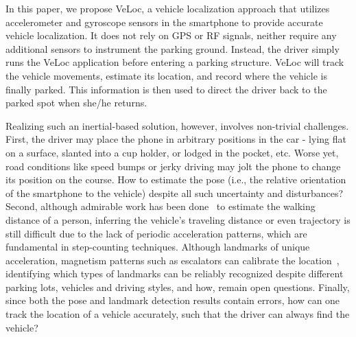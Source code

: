 

In this paper, we propose VeLoc, a vehicle localization approach that utilizes accelerometer and gyroscope sensors in the smartphone to provide accurate vehicle localization. It does not rely on GPS or RF signals, neither require any additional sensors to instrument the parking ground. Instead, the driver simply runs the VeLoc application before entering a parking structure. VeLoc will track the vehicle movements, estimate its location, and record where the vehicle is finally parked. This information is then used to direct the driver back to the parked spot when she/he returns.


Realizing such an inertial-based solution, however, involves non-trivial challenges. First, the driver may place the phone in arbitrary positions in the car - lying flat on a surface, slanted into a cup holder, or lodged in the pocket, etc. Worse yet, road conditions like speed bumps or jerky driving may jolt the phone to change its position on the course. How to estimate the pose (i.e., the relative orientation of the smartphone to the vehicle) despite all such uncertainty and disturbances? Second, although admirable work has been done~\cite{ParkSense,Lindqvist:Undistracted_Driving,Thiagarajan:2010,Mohan:Nericell} to estimate the walking distance of a person, inferring the vehicle's traveling distance or even trajectory is still difficult due to the lack of periodic acceleration patterns, which are fundamental in step-counting techniques. Although landmarks of unique acceleration, magnetism patterns such as escalators can calibrate the location~\cite{Wang:UnLoc}, identifying which types of landmarks can be reliably recognized despite different parking lots, vehicles and driving styles, and how, remain open questions. Finally, since both the pose and landmark detection results contain errors, how can one track the location of a vehicle accurately, such that the driver can always find the vehicle? %

